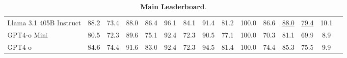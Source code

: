 \begin{table*}[!ht]
{\begin{tabular}{l c c c c c c c c c c c c c c}
Llama 3.1 405B Instruct  & 88.2 & 73.4    & 88.0 & 86.4    & 96.1 & 84.1    & 91.4 & 81.2    & 100.0 & 86.6     & \underline{88.0} & \underline{79.4} & 10.1       \\ 
GPT4-o Mini              & 80.5 & 72.3    & 89.6 & 75.1    & 92.4 & 72.3    & 90.5 & 77.1    & 100.0 & 70.3     & 81.1 & 69.9 & 8.9       \\
GPT4-o                   & 84.6 & 74.4    & 91.6 & 83.0    & 92.4 & 72.3    & 94.5 & 81.4    & 100.0 & 74.4     & 85.3 & 75.5 & 9.9       \\\bottomrule

\end{tabular}
}
\caption{\textbf{Main Leaderboard}.}
\label{tab: main_results}
\end{table*}